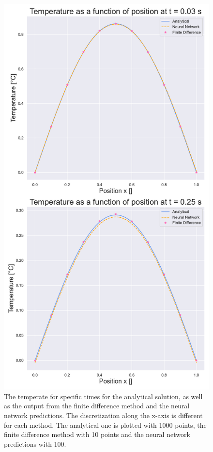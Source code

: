 \begin{figure}[h!]
    \centering
    \includegraphics[width=1.0\linewidth]{project_3/plots/time_slices_comparison.pdf}
    \caption{The temperate for specific times for the analytical solution, as well as the output from the finite difference method and the neural network predictions. The discretization along the x-axis is different for each method. The analytical one is plotted with 1000 points, the finite difference method with 10 points and the neural network predictions with 100. 
    }
    \label{fig:timeslices}
\end{figure}



